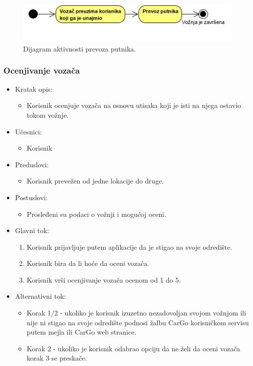 \begin{figure}[H]
\begin{center}
\includegraphics[scale=1.3]{Slike/PrevozPutnika.png}
\end{center}
    \caption{Dijagram aktivnosti prevoza putnika.}
\label{fig:PrevozPutnika}
\end{figure}

\subsubsection{\bfseries Ocenjivanje vozača}

\begin{itemize}
	\item Kratak opis:
		\begin{itemize}
			\item Korisnik ocenjuje vozača na osnovu utisaka koji je isti na njega ostavio tokom vožnje.
		\end{itemize}
	\item Učesnici:
		\begin{itemize}
			\item Korisnik
		\end{itemize}				
	\item Preduslovi:
		\begin{itemize}
		    \item Korisnik prevežen od jedne lokacije do druge.
		\end{itemize}
	\item Postuslovi:
		\begin{itemize}
			\item Prosleđeni su podaci o vožnji i mogućoj oceni.
		\end{itemize}		
	\item Glavni tok:
		\begin{enumerate}
		    \item Korisnik prijavljuje putem aplikacije da je stigao na svoje odredište.
		    \item Korisnik bira da li hoće da oceni vozača.
		    \item Korisnik vrši ocenjivanje vozača ocenom od 1 do 5. 
		\end{enumerate}
	\item Alternativni tok:
		\begin{itemize}
		    \item Korak 1/2 - ukoliko je korisnik izuzetno nezadovoljan svojom vožnjom ili nije ni stigao na svoje odredište podnosi žalbu CarGo korisničkom servisu putem mejla ili CarGo web stranice.
    		\item Korak 2 - ukoliko je korisnik odabrao opciju da ne želi da oceni vozača korak 3 se preskače.
		\end{itemize}
\end{itemize}

